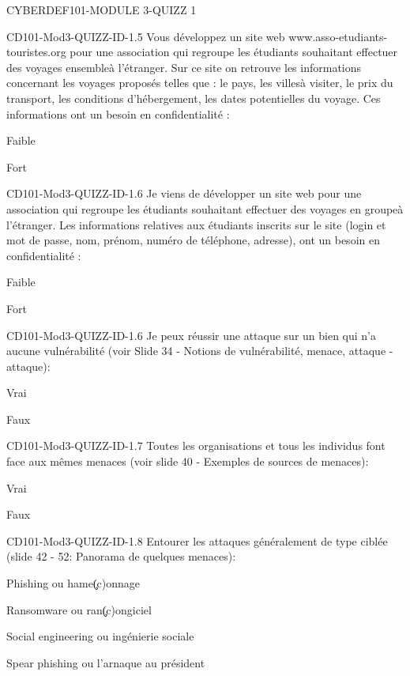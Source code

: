 \documentclass[12pt]{article}
\begin{document}
\begin{quiz}{CYBERDEF101-MODULE 3-QUIZZ 1}
\begin{multi}[multiple=true]{CD101-Mod3-QUIZZ-ID-1.5}
	Vous d\'eveloppez un site web www.asso-etudiants-touristes.org  pour une association qui regroupe les \'etudiants souhaitant effectuer des voyages ensemble\`a l'\'etranger. Sur ce site on retrouve les informations concernant les voyages propos\'es telles que : le pays, les villes\`a visiter, le prix du transport, les conditions d'h\'ebergement, les dates potentielles du voyage. Ces informations ont un besoin en confidentialit\'e :
\item* 	Faible
\item 	Fort
\end{multi}

\begin{multi}[multiple=true]{CD101-Mod3-QUIZZ-ID-1.6}
	Je viens de d\'evelopper un site web pour une association qui regroupe les \'etudiants souhaitant effectuer des voyages en groupe\`a l'\'etranger. Les informations relatives aux \'etudiants inscrits sur le site (login et mot de passe, nom, pr\'enom, num\'ero de t\'el\'ephone, adresse), ont un besoin en confidentialit\'e :
\item 	Faible
\item* 	Fort
\end{multi}

\begin{multi}[multiple=true]{CD101-Mod3-QUIZZ-ID-1.6}
	Je peux r\'eussir une attaque sur un bien qui n'a aucune vuln\'erabilit\'e (voir Slide 34 - Notions de vuln\'erabilit\'e, menace, attaque - attaque):
\item 	Vrai
\item* 	Faux
\end{multi}

\begin{multi}[multiple=true]{CD101-Mod3-QUIZZ-ID-1.7}
	Toutes les organisations et tous les individus font face aux m\^emes menaces (voir slide 40 - Exemples de sources de menaces):
\item 	Vrai
\item* 	Faux
\end{multi}

\begin{multi}[multiple=true]{CD101-Mod3-QUIZZ-ID-1.8}
	Entourer les attaques g\'en\'eralement de type  cibl\'ee (slide 42 - 52: Panorama de quelques menaces):
\item 	Phishing ou hame\c(c)onnage
\item 	Ransomware ou ran\c(c)ongiciel
\item* 	Social engineering ou ing\'enierie sociale
\item* 	Spear phishing ou l'arnaque au pr\'esident
\end{multi}


\end{quiz}
\end{document}
